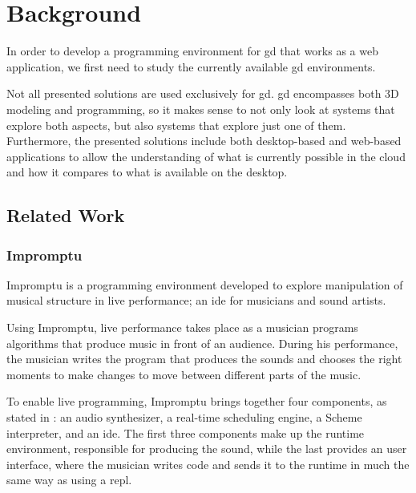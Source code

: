 
\chapter{Background}
\label{chapter:background}
In order to develop a programming environment for \gls{gd} that works as a web application, we first need to study the currently available \gls{gd} environments.

Not all presented solutions are used exclusively for \gls{gd}.
\gls{gd} encompasses both 3D modeling and programming, so it makes sense to not only look at systems that explore both aspects, but also systems that explore just one of them.
Furthermore, the presented solutions include both desktop-based and web-based applications to allow the understanding of what is currently possible in the cloud and how it compares to what is available on the desktop.


\section{Related Work}


\subsection{Impromptu}
\label{section:impromptu:related}
Impromptu\cite{sorensen2005impromptu,sorensen2010programming} is a programming environment developed to explore manipulation of musical structure in live performance; an \gls{ide} for musicians and sound artists.

Using Impromptu, live performance takes place as a musician programs algorithms that produce music in front of an audience.
During his performance, the musician writes the program that produces the sounds and chooses the right moments to make changes to move between different parts of the music.

To enable live programming, Impromptu brings together four components, as stated in \cite{sorensen2005impromptu}: an audio synthesizer, a real-time scheduling engine, a Scheme interpreter, and an \gls{ide}.
The first three components make up the runtime environment, responsible for producing the sound, while the last provides an user interface, where the musician writes code and sends it to the runtime in much the same way as using a \gls{repl}.

